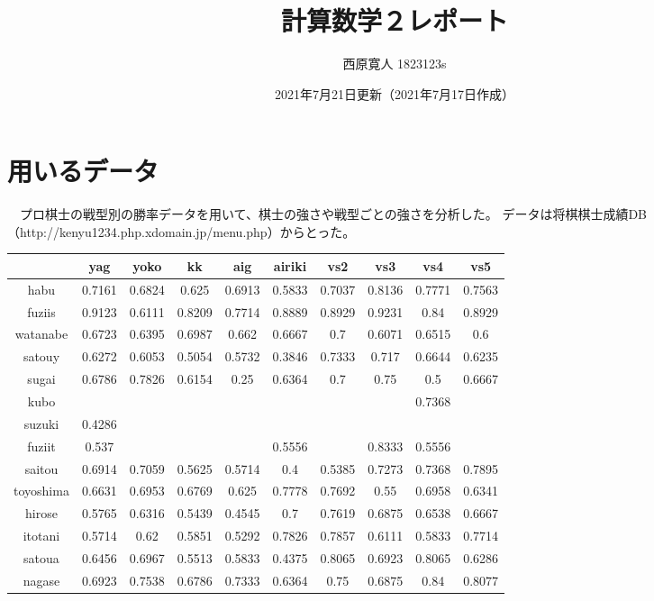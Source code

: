 \documentclass[11pt,a4paper,dvipdfmx]{jsarticle}
\title{計算数学２レポート}
\author{西原寛人 1823123s}
\date{2021年7月21日更新（2021年7月17日作成）}
\begin{document}
\maketitle
%
%
%
%
%
\section{用いるデータ}
　プロ棋士の戦型別の勝率データを用いて、棋士の強さや戦型ごとの強さを分析した。
データは将棋棋士成績DB（http://kenyu1234.php.xdomain.jp/menu.php）からとった。
\\
\begin{tabular}{c||c|c|c|c|c|c|c|c|c} 
    & yag & yoko & kk & aig & airiki & vs2 & vs3 & vs4 & vs5 \\ \hline
    habu & 0.7161 & 0.6824 & 0.625 & 0.6913 & 0.5833 & 0.7037 & 0.8136 & 0.7771 & 0.7563 \\
    fuziis & 0.9123 & 0.6111 & 0.8209 & 0.7714 & 0.8889 & 0.8929 & 0.9231 & 0.84 & 0.8929 \\
    watanabe & 0.6723 & 0.6395 & 0.6987 & 0.662 & 0.6667 & 0.7 & 0.6071 & 0.6515 & 0.6 \\
    satouy & 0.6272 & 0.6053 & 0.5054 & 0.5732 & 0.3846 & 0.7333 & 0.717 & 0.6644 & 0.6235 \\
    sugai & 0.6786 & 0.7826 & 0.6154 & 0.25 & 0.6364 & 0.7 & 0.75 & 0.5 & 0.6667 \\
    kubo &  &  &  &  &  &  &  & 0.7368 &  \\
    suzuki & 0.4286 &  &  &  &  &  &  &  &  \\
    fuziit & 0.537 &  &  &  & 0.5556 &  & 0.8333 & 0.5556 &  \\
    saitou & 0.6914 & 0.7059 & 0.5625 & 0.5714 & 0.4 & 0.5385 & 0.7273 & 0.7368 & 0.7895 \\
    toyoshima & 0.6631 & 0.6953 & 0.6769 & 0.625 & 0.7778 & 0.7692 & 0.55 & 0.6958 & 0.6341 \\
    hirose & 0.5765 & 0.6316 & 0.5439 & 0.4545 & 0.7 & 0.7619 & 0.6875 & 0.6538 & 0.6667 \\
    itotani & 0.5714 & 0.62 & 0.5851 & 0.5292 & 0.7826 & 0.7857 & 0.6111 & 0.5833 & 0.7714 \\
    satoua & 0.6456 & 0.6967 & 0.5513 & 0.5833 & 0.4375 & 0.8065 & 0.6923 & 0.8065 & 0.6286 \\
    nagase & 0.6923 & 0.7538 & 0.6786 & 0.7333 & 0.6364 & 0.75 & 0.6875 & 0.84 & 0.8077 \\

\end{tabular}
\end{document}
